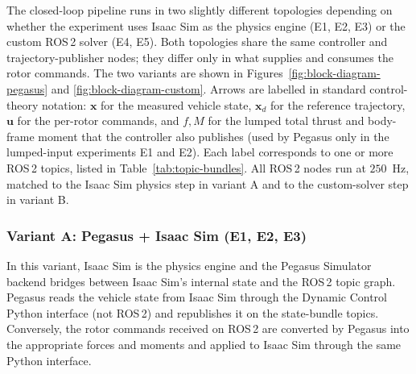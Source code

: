 \documentclass[11pt]{article}
\theoremstyle{remark}
\begin{document}
The closed-loop pipeline runs in two slightly different topologies depending on whether the experiment uses Isaac Sim as the physics engine (E1, E2, E3) or the custom ROS\,2 solver (E4, E5). Both topologies share the same controller and trajectory-publisher nodes; they differ only in what supplies and consumes the rotor commands. The two variants are shown in Figures~\ref{fig:block-diagram-pegasus} and \ref{fig:block-diagram-custom}. Arrows are labelled in standard control-theory notation: $\mathbf{x}$ for the measured vehicle state, $\mathbf{x}_d$ for the reference trajectory, $\mathbf{u}$ for the per-rotor commands, and $f, M$ for the lumped total thrust and body-frame moment that the controller also publishes (used by Pegasus only in the lumped-input experiments E1 and E2). Each label corresponds to one or more ROS\,2 topics, listed in Table~\ref{tab:topic-bundles}. All ROS\,2 nodes run at $250$~Hz, matched to the Isaac Sim physics step in variant A and to the custom-solver step in variant B.

\subsubsection{Variant A: Pegasus + Isaac Sim (E1, E2, E3)}

In this variant, Isaac Sim is the physics engine and the Pegasus Simulator backend bridges between Isaac Sim's internal state and the ROS\,2 topic graph. Pegasus reads the vehicle state from Isaac Sim through the Dynamic Control Python interface (not ROS\,2) and republishes it on the state-bundle topics. Conversely, the rotor commands received on ROS\,2 are converted by Pegasus into the appropriate forces and moments and applied to Isaac Sim through the same Python interface.
\end{document}
